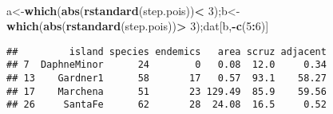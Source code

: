 \documentclass[]{article}
\newenvironment{Shaded}{\begin{snugshade}}{\end{snugshade}}
\newcommand{\KeywordTok}[1]{\textcolor[rgb]{0.13,0.29,0.53}{\textbf{#1}}}
\newcommand{\DecValTok}[1]{\textcolor[rgb]{0.00,0.00,0.81}{#1}}
\newcommand{\StringTok}[1]{\textcolor[rgb]{0.31,0.60,0.02}{#1}}
\newcommand{\OperatorTok}[1]{\textcolor[rgb]{0.81,0.36,0.00}{\textbf{#1}}}
\newcommand{\NormalTok}[1]{#1}
\begin{document}
~

\begin{Shaded}
\begin{Highlighting}[]
\NormalTok{a<-}\KeywordTok{which}\NormalTok{(}\KeywordTok{abs}\NormalTok{(}\KeywordTok{rstandard}\NormalTok{(step.pois))}\OperatorTok{<}\StringTok{ }\DecValTok{3}\NormalTok{);b<-}\KeywordTok{which}\NormalTok{(}\KeywordTok{abs}\NormalTok{(}\KeywordTok{rstandard}\NormalTok{(step.pois))}\OperatorTok{>}\StringTok{ }\DecValTok{3}\NormalTok{);dat[b,}\OperatorTok{-}\KeywordTok{c}\NormalTok{(}\DecValTok{5}\OperatorTok{:}\DecValTok{6}\NormalTok{)] }
\end{Highlighting}
\end{Shaded}

\begin{verbatim}
##         island species endemics   area scruz adjacent
## 7  DaphneMinor      24        0   0.08  12.0     0.34
## 13    Gardner1      58       17   0.57  93.1    58.27
## 17    Marchena      51       23 129.49  85.9    59.56
## 26     SantaFe      62       28  24.08  16.5     0.52
\end{verbatim}
\end{document}
